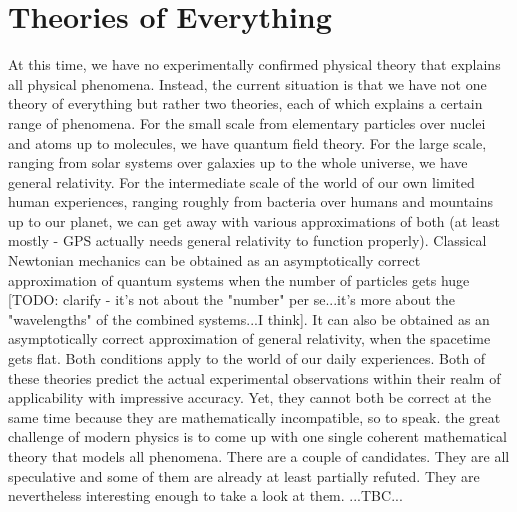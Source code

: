 
\section{Theories of Everything}
At this time, we have no experimentally confirmed physical theory that explains all physical phenomena. Instead, the current situation is that we have not one theory of everything but rather two theories, each of which explains a certain range of phenomena. For the small scale from elementary particles over nuclei and atoms up to molecules, we have quantum field theory. For the large scale, ranging from solar systems over galaxies up to the whole universe, we have general relativity. For the intermediate scale of the world of our own limited human experiences, ranging roughly from bacteria over humans and mountains up to our planet, we can get away with various approximations of both (at least mostly - GPS actually needs general relativity to function properly). Classical Newtonian mechanics can be obtained as an asymptotically correct approximation of quantum systems when the number of particles gets huge [TODO: clarify - it's not about the "number" per se...it's more about the "wavelengths" of the combined systems...I think]. It can also be obtained as an asymptotically correct approximation of general relativity, when the spacetime gets flat. Both conditions apply to the world of our daily experiences. Both of these theories predict the actual experimental observations within their realm of applicability with impressive accuracy. Yet, they cannot both be correct at the same time because they are mathematically incompatible, so to speak. the great challenge of modern physics is to come up with one single coherent mathematical theory that models all phenomena. There are a couple of candidates. They are all speculative and some of them are already at least partially refuted. They are nevertheless interesting enough to take a look at them. ...TBC...








